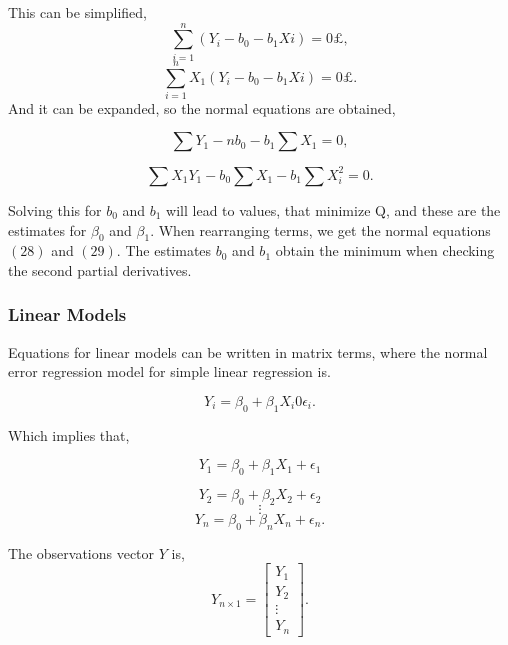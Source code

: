 \noindent This can be simplified, 
\begin{equation}
\sum_{i=1}^{n} (Y_i - b_0 - b_1 Xi)=0£ ,
\end{equation}
\begin{equation}
	\sum_{i=1}^{n} X_1(Y_i - b_0 - b_1 Xi)=0£ .
\end{equation}
And it can be expanded, so the normal equations are obtained, 

\begin{equation}
	\sum Y_1 - n b_0 - b_1 \sum X_1 =0 ,
\end{equation}

\begin{equation}
	\sum X_1 Y_1  - b_0 \sum X_1 - b_1 \sum X_i^2 =0 .
\end{equation}

\noindent Solving this for $b_0$ and $b_1$ will lead to values, that minimize Q, and these are the estimates for $\beta_0$ and $\beta_1$. 
When rearranging terms, we get the normal equations $(28)$ and $(29)$. The estimates $b_0$ and $b_1$ obtain the minimum when checking the second partial derivatives. \newline


\subsubsection{Linear Models}
Equations for linear models can be written in matrix terms, where the normal error regression model for simple linear regression is.
 

\begin{equation}
Y_i = \beta_0 + \beta_1 X_i 0 \epsilon_i .
\end{equation}


\noindent Which implies that,

\begin{equation}
Y_1 = \beta_0 + \beta_1 X_1 + \epsilon_1
\end{equation}

\begin{equation}
Y_2 = \beta_0 + \beta_2 X_2 + \epsilon_2
\end{equation}
$$\vdots$$
\begin{equation}
Y_n = \beta_0 + \beta_n X_n + \epsilon_n .
\end{equation}

\noindent The observations vector $Y$ is,
\begin{equation} Y_{n \times 1} =
\left[
\begin{array}{c}
	Y_1 \\ 
	Y_2 \\ 
	\vdots \\
	Y_n 
\end{array}
\right].
\end{equation}

